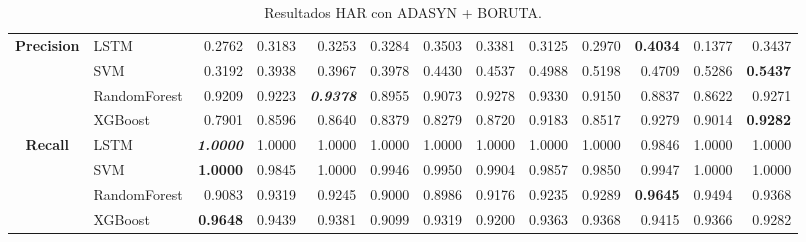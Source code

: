 \begin{table}[H]
\begin{adjustbox}{max width=12cm}
\begin{tabular}{|c|l|r|r|r|r|r|r|r|r|r|r|r|}
			\hline
			\textbf{Precision} &  LSTM &  0.2762 &  0.3183 &  0.3253 &  0.3284 &  0.3503 &  0.3381 &  0.3125 &  0.2970 & \textbf{  0.4034 } &  0.1377 &  0.3437 \\
			&  SVM &  0.3192 &  0.3938 &  0.3967 &  0.3978 &  0.4430 &  0.4537 &  0.4988 &  0.5198 &  0.4709 &  0.5286 & \textbf{  0.5437 } \\
			&  RandomForest &  0.9209 &  0.9223 & \textit{ \textbf{  0.9378 } } &  0.8955 &  0.9073 &  0.9278 &  0.9330 &  0.9150 &  0.8837 &  0.8622 &  0.9271 \\
			&  XGBoost &  0.7901 &  0.8596 &  0.8640 &  0.8379 &  0.8279 &  0.8720 &  0.9183 &  0.8517 &  0.9279 &  0.9014 & \textbf{  0.9282 } \\
			\hline
			\textbf{Recall} &  LSTM & \textit{ \textbf{  1.0000 } } &  1.0000 &  1.0000 &  1.0000 &  1.0000 &  1.0000 &  1.0000 &  1.0000 &  0.9846 &  1.0000 &  1.0000 \\
			&  SVM & \textbf{  1.0000 } &  0.9845 &  1.0000 &  0.9946 &  0.9950 &  0.9904 &  0.9857 &  0.9850 &  0.9947 &  1.0000 &  1.0000 \\
			&  RandomForest &  0.9083 &  0.9319 &  0.9245 &  0.9000 &  0.8986 &  0.9176 &  0.9235 &  0.9289 & \textbf{  0.9645 } &  0.9494 &  0.9368 \\
			&  XGBoost & \textbf{  0.9648 } &  0.9439 &  0.9381 &  0.9099 &  0.9319 &  0.9200 &  0.9363 &  0.9368 &  0.9415 &  0.9366 &  0.9282 \\
			\hline
		\end{tabular}
	\end{adjustbox}
	\caption{Resultados HAR con ADASYN + BORUTA.}
	\label{tab:HAR_ADASYN_BORUTA}
\end{table}

